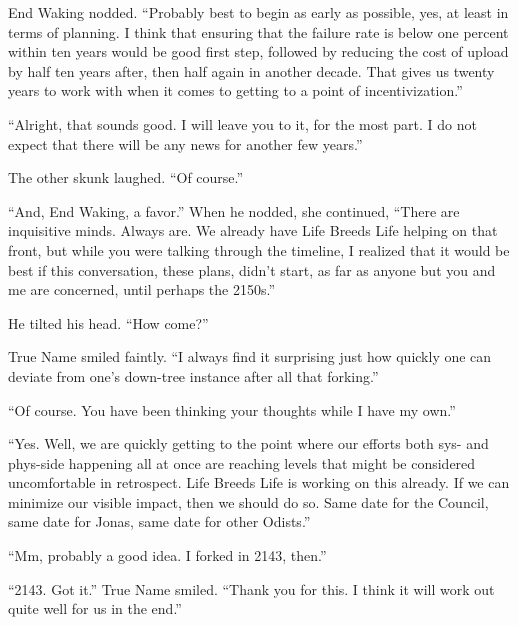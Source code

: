 End Waking nodded. ``Probably best to begin as early as possible, yes, at least in terms of planning. I think that ensuring that the failure rate is below one percent within ten years would be good first step, followed by reducing the cost of upload by half ten years after, then half again in another decade. That gives us twenty years to work with when it comes to getting to a point of incentivization.''

``Alright, that sounds good. I will leave you to it, for the most part. I do not expect that there will be any news for another few years.''

The other skunk laughed. ``Of course.''

``And, End Waking, a favor.'' When he nodded, she continued, ``There are inquisitive minds. Always are. We already have Life Breeds Life helping on that front, but while you were talking through the timeline, I realized that it would be best if this conversation, these plans, didn't start, as far as anyone but you and me are concerned, until perhaps the 2150s.''

He tilted his head. ``How come?''

True Name smiled faintly. ``I always find it surprising just how quickly one can deviate from one's down-tree instance after all that forking.''

``Of course. You have been thinking your thoughts while I have my own.''

``Yes. Well, we are quickly getting to the point where our efforts both sys- and phys-side happening all at once are reaching levels that might be considered uncomfortable in retrospect. Life Breeds Life is working on this already. If we can minimize our visible impact, then we should do so. Same date for the Council, same date for Jonas, same date for other Odists.''

``Mm, probably a good idea. I forked in 2143, then.''

``2143. Got it.'' True Name smiled. ``Thank you for this. I think it will work out quite well for us in the end.''
